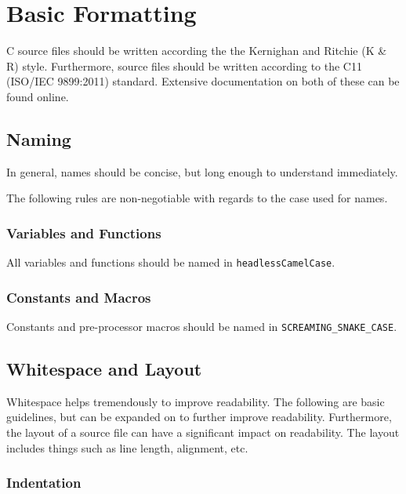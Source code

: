 \documentclass[StyleGuide.tex]{subfiles}
\begin{document}
\chapter{Basic Formatting}\label{basic-formatting}

C source files should be written according the the Kernighan and Ritchie
(K \& R) style. Furthermore, source files should be written according to
the C11 (ISO/IEC 9899:2011) standard. Extensive documentation on both of
these can be found online.

\section{Naming}\label{naming}

In general, names should be concise, but long enough to understand
immediately.

The following rules are non-negotiable with regards to the case used for
names.

\subsection{Variables and Functions}\label{variables-and-functions}

All variables and functions should be named in
\texttt{headlessCamelCase}.

\subsection{Constants and Macros}\label{constants-and-macros}

Constants and pre-processor macros should be named in
\texttt{SCREAMING\_SNAKE\_CASE}.

\section{Whitespace and Layout}\label{whitespace}

Whitespace helps tremendously to improve readability. The following are
basic guidelines, but can be expanded on to further improve readability.
Furthermore, the layout of a source file can have a significant impact
on readability. The layout includes things such as line length, alignment,
etc.

\subsection{Indentation}\label{indentation}
\end{document}
